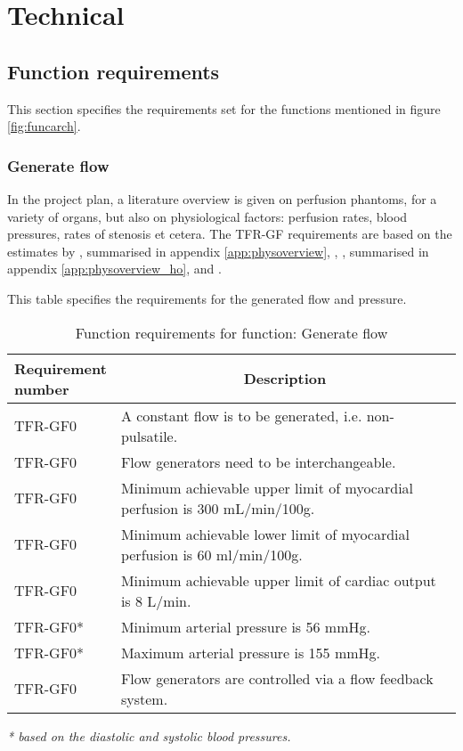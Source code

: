 \chapter{Technical}

\section{Function requirements}
This section specifies the requirements set for the functions mentioned in figure \ref{fig:funcarch}.
\subsection{Generate flow}
In the project plan, a literature overview is given on perfusion phantoms, for a variety of organs, but also on physiological factors: perfusion rates, blood pressures, rates of stenosis et cetera. The TFR-GF requirements are based on the estimates by \cite{uren1994relation}, summarised in appendix \ref{app:physoverview}, \cite{chiribiri2013normal}, \cite{ho2014dynamic}, summarised in appendix \ref{app:physoverview_ho}, and \cite{slart2015pres}.

\begin{table} [H]
\caption{Function requirements for function: Generate flow}
\label{tab:funcreq_tec}
This table specifies the requirements for the generated flow and pressure.
\begin{tabular}{l|p{120mm}|}
	\makecell[l]{\textbf{Requirement} \\  \textbf{number}} & \multicolumn{1}{c}{\textbf{Description}}\\
	\hline
	TFR-GF0 & A constant flow is to be generated, i.e. non-pulsatile. \\
	TFR-GF0 & Flow generators need to be interchangeable. \\
	TFR-GF0 & Minimum achievable upper limit of myocardial perfusion is 300 mL/min/100g. \\
	TFR-GF0 & Minimum achievable lower limit of myocardial perfusion is 60 ml/min/100g. \\
	TFR-GF0 & Minimum achievable upper limit of cardiac output is 8 L/min.\\
	TFR-GF0* & Minimum arterial pressure is 56 mmHg. \\
	TFR-GF0* & Maximum arterial pressure is  155 mmHg. \\
	TFR-GF0 & Flow generators are controlled via a flow feedback system. \\
	\cline{2-2}
\end{tabular}
\raggedright
\textit{* based on the diastolic and systolic blood pressures.}
\end{table}

